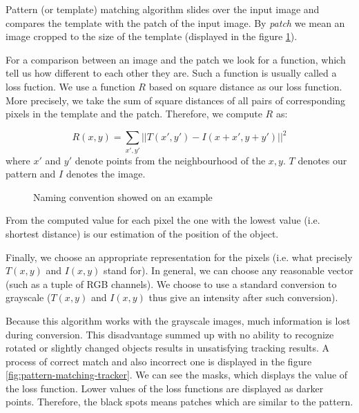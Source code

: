 Pattern (or template) matching algorithm slides over the input image and
compares the template with the patch of the input image. By \emph{patch} we
mean an image cropped to the size of the template (displayed in the figure
\ref{fig:patternmatching-naming}).

For a comparison between an image and the patch we look for a function, which
tell us how different to each other they are. Such a function is usually called
a loss fuction. We use a function $R$ based on square distance as our loss
function. More precisely, we take the sum of square distances of all pairs of
corresponding pixels in the template and the patch. Therefore, we compute $R$
as:

$$
R(x, y) =
\sum_{x', y'} ||T(x', y') - I(x + x', y + y')||^2
$$
where $x'$ and $y'$ denote points from the neighbourhood of the $x, y$. $T$
denotes our pattern and $I$ denotes the image. 

\begin{figure}[h]
	\centering
	\def\svgwidth{0.9\linewidth}
	
	\caption{Naming convention showed on an example}
	\label{fig:patternmatching-naming}
\end{figure}

From the computed value for each pixel the one with the lowest value
(i.e. shortest distance) is our estimation of the position of the object.

Finally, we choose an appropriate representation for the pixels (i.e. what
precisely $T(x, y)$ and $I(x, y)$ stand for). In general, we can choose any
reasonable vector (such as a tuple of RGB channels). We choose to use a standard
conversion to grayscale ($T(x, y)$ and $I(x, y)$ thus give an intensity after
such conversion).

Because this algorithm works with the grayscale images, much information is
lost during conversion. This disadvantage summed up with no ability to
recognize rotated or slightly changed objects results in unsatisfying tracking
results. A process of correct match and also incorrect one is displayed in the
figure \ref{fig:pattern-matching-tracker}. We can see the masks, which displays
the value of the loss function. Lower values of the loss functions are
displayed as darker points. Therefore, the black spots means patches which are
similar to the pattern.

